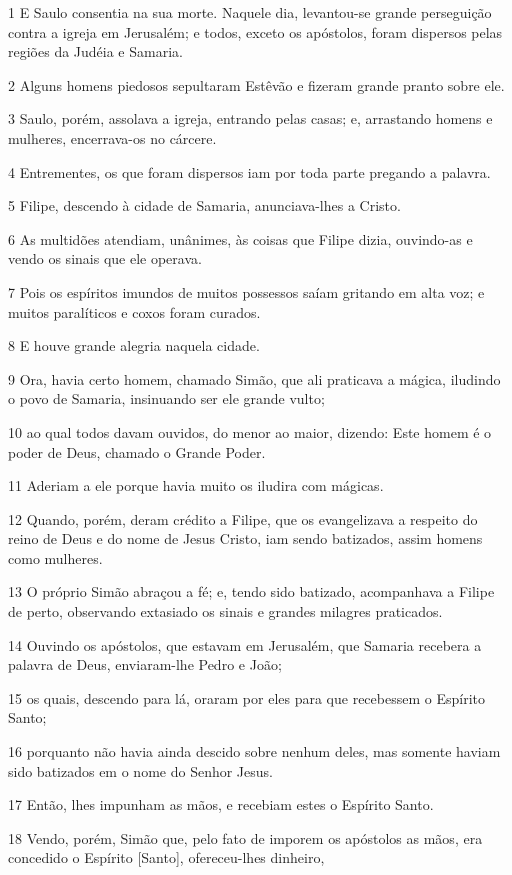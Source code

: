 \par 1 E Saulo consentia na sua morte. Naquele dia, levantou-se grande perseguição contra a igreja em Jerusalém; e todos, exceto os apóstolos, foram dispersos pelas regiões da Judéia e Samaria.
\par 2 Alguns homens piedosos sepultaram Estêvão e fizeram grande pranto sobre ele.
\par 3 Saulo, porém, assolava a igreja, entrando pelas casas; e, arrastando homens e mulheres, encerrava-os no cárcere.
\par 4 Entrementes, os que foram dispersos iam por toda parte pregando a palavra.
\par 5 Filipe, descendo à cidade de Samaria, anunciava-lhes a Cristo.
\par 6 As multidões atendiam, unânimes, às coisas que Filipe dizia, ouvindo-as e vendo os sinais que ele operava.
\par 7 Pois os espíritos imundos de muitos possessos saíam gritando em alta voz; e muitos paralíticos e coxos foram curados.
\par 8 E houve grande alegria naquela cidade.
\par 9 Ora, havia certo homem, chamado Simão, que ali praticava a mágica, iludindo o povo de Samaria, insinuando ser ele grande vulto;
\par 10 ao qual todos davam ouvidos, do menor ao maior, dizendo: Este homem é o poder de Deus, chamado o Grande Poder.
\par 11 Aderiam a ele porque havia muito os iludira com mágicas.
\par 12 Quando, porém, deram crédito a Filipe, que os evangelizava a respeito do reino de Deus e do nome de Jesus Cristo, iam sendo batizados, assim homens como mulheres.
\par 13 O próprio Simão abraçou a fé; e, tendo sido batizado, acompanhava a Filipe de perto, observando extasiado os sinais e grandes milagres praticados.
\par 14 Ouvindo os apóstolos, que estavam em Jerusalém, que Samaria recebera a palavra de Deus, enviaram-lhe Pedro e João;
\par 15 os quais, descendo para lá, oraram por eles para que recebessem o Espírito Santo;
\par 16 porquanto não havia ainda descido sobre nenhum deles, mas somente haviam sido batizados em o nome do Senhor Jesus.
\par 17 Então, lhes impunham as mãos, e recebiam estes o Espírito Santo.
\par 18 Vendo, porém, Simão que, pelo fato de imporem os apóstolos as mãos, era concedido o Espírito [Santo], ofereceu-lhes dinheiro,
